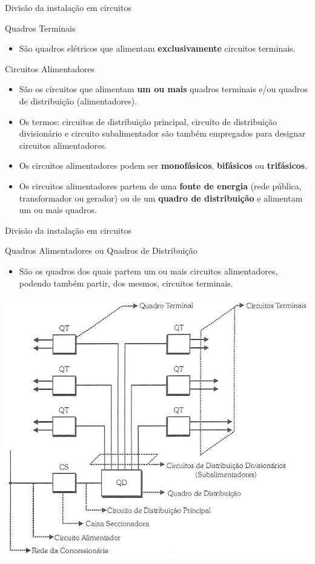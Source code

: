 \begin{frame}{Divisão da instalação em circuitos}
	\begin{block}{Quadros Terminais}
		\begin{itemize}
			\item São quadros elétricos que alimentam \textbf{exclusivamente} circuitos terminais.
		\end{itemize}
	\end{block}

	\begin{block}{Circuitos Alimentadores}
		\begin{itemize}
			\item São os circuitos que alimentam \textbf{um ou mais} quadros terminais e/ou quadros de distribuição (alimentadores).
			\item Os termos: circuitos de distribuição principal, circuito de distribuição divisionário e circuito subalimentador são também empregados para designar circuitos alimentadores.
			\item Os circuitos alimentadores podem ser \textbf{monofásicos}, \textbf{bifásicos }ou \textbf{trifásicos}.
			\item Os circuitos alimentadores partem de uma \textbf{fonte de energia} (rede pública, transformador ou gerador) ou de um \textbf{quadro de distribuição }e alimentam um ou mais quadros.
		\end{itemize}
	\end{block}
\end{frame}


\begin{frame}{Divisão da instalação em circuitos}
	\begin{block}{Quadros Alimentadores ou Quadros de Distribuição}
		\begin{itemize}
			\item São os quadros dos quais partem um ou mais circuitos alimentadores, podendo também partir, dos mesmos, circuitos terminais.
		\end{itemize}
	\end{block}

	\centering
	\includegraphics[width=0.55\linewidth]{Figuras/Ch05/fig15}
\end{frame}


